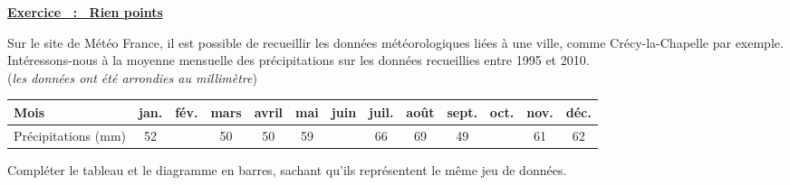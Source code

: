 \documentclass[11pt]{memoir}
\newcounter{exercice}
\newcounter{question}
\newcounter{subpart}
\newcommand{\exercice}[1][Rien]
{
    \setcounter{question}{0}
    \setcounter{subpart}{0}
    \stepcounter{exercice}
    \par\noindent\underline{\textbf{Exercice \theexercice~:~%
    \ifthenelse{\equal{#1}{Rien}}%
    {}
    {%
    #1 points%
    }%
    }}%
}
\newenvironment{questions}
{
    \setcounter{question}{0}
    \setcounter{part}{0}
    \setcounter{subpart}{0}
}
{

}
\begin{document}
\begin{questions}
\exercice 

Sur le site de Météo France, il est possible de recueillir les données météorologiques liées à une ville, comme Crécy-la-Chapelle par exemple. \\
Intéressons-nous à la moyenne mensuelle des précipitations sur les données recueillies entre 1995 et 2010. \\(\textit{les données ont été arrondies au millimètre})

\begin{center}
\begin{tabular}{|l||*{12}{c|}}\hline
    Mois & jan. & fév. & mars & avril & mai & juin & juil. & août & sept. & oct. & nov. & déc. \\\hline
    Précipitations (\unit{\milli\meter}) & 52 &  & 50 & 50 & 59 &  & 66 & 69 & 49 &  & 61 & 62 \\\hline
\end{tabular}
\end{center}

\begin{center}
\end{center}

Compléter le tableau et le diagramme en barres, sachant qu'ils représentent le même jeu de données.

\end{questions}
\end{document}
